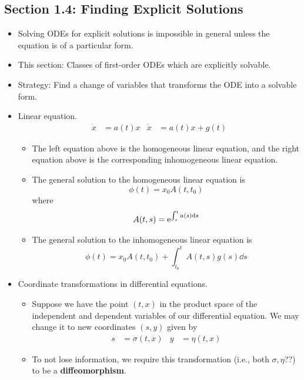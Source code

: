 \documentclass[../notes.tex]{subfiles}
\begin{document}
\subsection*{Section 1.4: Finding Explicit Solutions}
\begin{itemize}
    \item Solving ODEs for explicit solutions is impossible in general unless the equation is of a particular form.
    \item This section: Classes of first-order ODEs which are explicitly solvable.
    \item Strategy: Find a change of variables that transforms the ODE into a solvable form.
    \item Linear equation.
    \begin{align*}
        \dot{x} &= a(t)x&
        \dot{x} &= a(t)x+g(t)
    \end{align*}
    \begin{itemize}
        \item The left equation above is the homogeneous linear equation, and the right equation above is the corresponding inhomogeneous linear equation.
        \item The general solution to the homogeneous linear equation is
        \begin{equation*}
            \phi(t) = x_0A(t,t_0)
        \end{equation*}
        where
        \begin{equation*}
            A(t,s) = \e[\int_s^ta(s)\dd{s}]
        \end{equation*}
        \item The general solution to the inhomogeneous linear equation is
        \begin{equation*}
            \phi(t) = x_0A(t,t_0)+\int_{t_0}^tA(t,s)g(s)\dd{s}
        \end{equation*}
    \end{itemize}
    \item Coordinate transformations in differential equations.
    \begin{itemize}
        \item Suppose we have the point $(t,x)$ in the product space of the independent and dependent variables of our differential equation. We may change it to new coordinates $(s,y)$ given by
        \begin{align*}
            s &= \sigma(t,x)&
            y &= \eta(t,x)
        \end{align*}
        \item To not lose information, we require this transformation (i.e., both $\sigma,\eta$??) to be a \textbf{diffeomorphism}.

\end{itemize}
\end{itemize}
\end{document}
